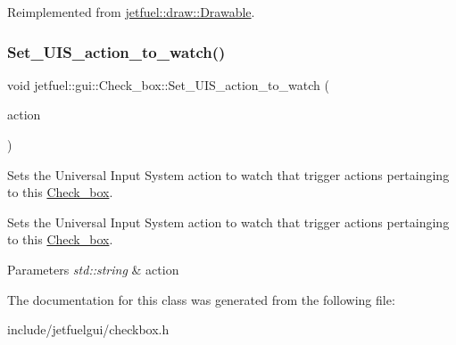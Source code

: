 Reimplemented from \hyperlink{classjetfuel_1_1draw_1_1Drawable_afdd035afe40c706459a6c9df813bcce6}{jetfuel\+::draw\+::\+Drawable}.

\mbox{\label{classjetfuel_1_1gui_1_1Check__box_a92a70756f7b7d37c3b40a08bc251ff8b}} 
\subsubsection{\texorpdfstring{Set\+\_\+\+U\+I\+S\+\_\+action\+\_\+to\+\_\+watch()}{Set\_UIS\_action\_to\_watch()}}
{\footnotesize\ttfamily void jetfuel\+::gui\+::\+Check\+\_\+box\+::\+Set\+\_\+\+U\+I\+S\+\_\+action\+\_\+to\+\_\+watch (\begin{DoxyParamCaption}\item[{const std\+::string}]{action }\end{DoxyParamCaption})\hspace{0.3cm}{\ttfamily [inline]}}



Sets the Universal Input System action to watch that trigger actions pertainging to this \hyperlink{classjetfuel_1_1gui_1_1Check__box}{Check\+\_\+box}. 

Sets the Universal Input System action to watch that trigger actions pertainging to this \hyperlink{classjetfuel_1_1gui_1_1Check__box}{Check\+\_\+box}.


\begin{DoxyParams}{Parameters}
{\em std\+::string} & action \\
\hline
\end{DoxyParams}


The documentation for this class was generated from the following file\+:\begin{DoxyCompactItemize}
\item 
include/jetfuelgui/checkbox.\+h\end{DoxyCompactItemize}
